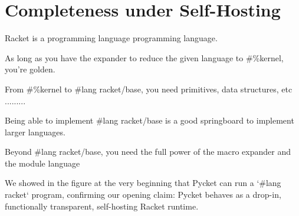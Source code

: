 	\section[\texorpdfstring{Completeness under Self-Hosting}{Completeness}]{Completeness under Self-Hosting}
		\begin{paragraph-here}%
			Racket is a programming language programming language.
		\end{paragraph-here}

		\begin{paragraph-here}%
			As long as you have the expander to reduce the given language to \#\%kernel, you're golden.
		\end{paragraph-here}

		\begin{paragraph-here}%
			From \#\%kernel to \#lang racket/base, you need primitives, data structures, etc .........
		\end{paragraph-here}

		\begin{paragraph-here}%
			Being able to implement \#lang racket/base is a good springboard to implement larger languages.
		\end{paragraph-here}

		\begin{paragraph-here}%
			Beyond \#lang racket/base, you need the full power of the macro expander and the module language
		\end{paragraph-here}

		\begin{paragraph-here}%
			We showed in the figure at the very beginning that Pycket can run a `\#lang racket` program, confirming our opening claim: Pycket behaves as a drop-in, functionally transparent, self-hosting Racket runtime.
		\end{paragraph-here}

